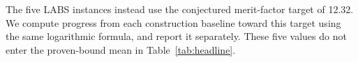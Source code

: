 The five LABS instances instead use the conjectured merit-factor target of 12.32. We compute progress from each construction baseline toward this target using the same logarithmic formula, and report it separately. These five values do not enter the proven-bound mean in Table~\ref{tab:headline}.
\begin{center}
\footnotesize\setlength{\tabcolsep}{4pt}

\label{tab:gap_breakdown}
\end{center}
